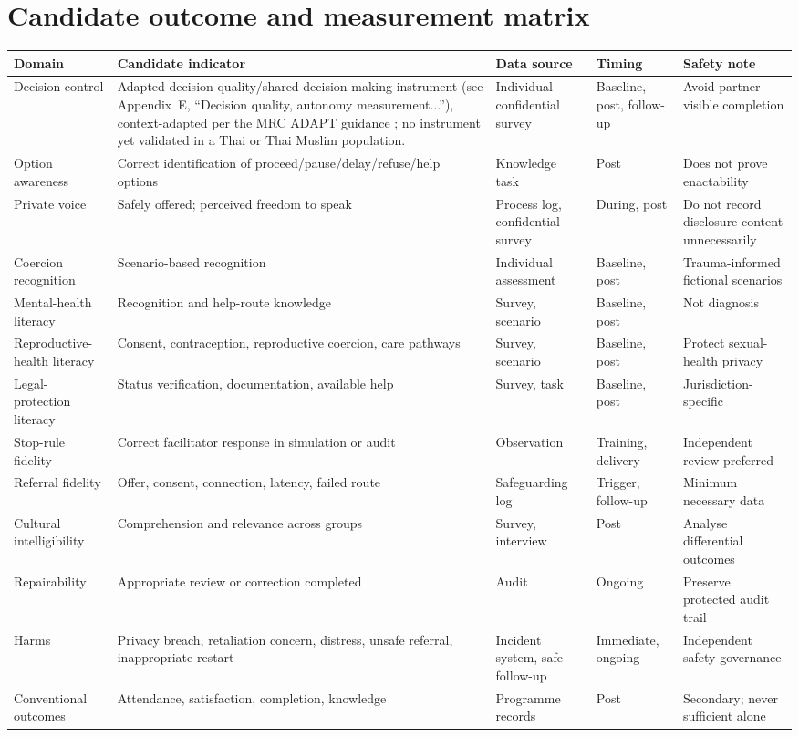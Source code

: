 \documentclass[10pt,twocolumn]{article}
\begin{document}
\section{Candidate outcome and measurement matrix}
\footnotesize
\begin{tabularx}{\textwidth}{@{}p{3cm}YYp{2.2cm}Y@{}}
\toprule
\textbf{Domain} & \textbf{Candidate indicator} & \textbf{Data source} & \textbf{Timing} & \textbf{Safety note}\\
\midrule
Decision control & Adapted decision-quality\slash shared-decision-making instrument (see Appendix~E, ``Decision quality, autonomy measurement...''), context-adapted per the MRC ADAPT guidance \cite{ref53}; no instrument yet validated in a Thai or Thai Muslim population. & Individual confidential survey & Baseline, post, follow-up & Avoid partner-visible completion\\
Option awareness & Correct identification of proceed\slash pause\slash delay\slash refuse\slash help options & Knowledge task & Post & Does not prove enactability\\
Private voice & Safely offered; perceived freedom to speak & Process log, confidential survey & During, post & Do not record disclosure content unnecessarily\\
Coercion recognition & Scenario-based recognition & Individual assessment & Baseline, post & Trauma-informed fictional scenarios\\
Mental-health literacy & Recognition and help-route knowledge & Survey, scenario & Baseline, post & Not diagnosis\\
Reproductive-health literacy & Consent, contraception, reproductive coercion, care pathways & Survey, scenario & Baseline, post & Protect sexual-health privacy\\
Legal-protection literacy & Status verification, documentation, available help & Survey, task & Baseline, post & Jurisdiction-specific\\
Stop-rule fidelity & Correct facilitator response in simulation or audit & Observation & Training, delivery & Independent review preferred\\
Referral fidelity & Offer, consent, connection, latency, failed route & Safeguarding log & Trigger, follow-up & Minimum necessary data\\
Cultural intelligibility & Comprehension and relevance across groups & Survey, interview & Post & Analyse differential outcomes\\
Repairability & Appropriate review or correction completed & Audit & Ongoing & Preserve protected audit trail\\
Harms & Privacy breach, retaliation concern, distress, unsafe referral, inappropriate restart & Incident system, safe follow-up & Immediate, ongoing & Independent safety governance\\
Conventional outcomes & Attendance, satisfaction, completion, knowledge & Programme records & Post & Secondary; never sufficient alone\\
\bottomrule
\end{tabularx}
\end{document}
